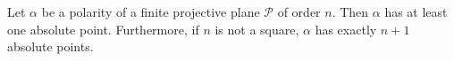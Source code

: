 Let $\alpha$ be a polarity of a finite projective plane $\mathcal{P}$ of order $n$. Then $\alpha$ has at least one absolute point. Furthermore, if $n$ is not a square, $\alpha$ has exactly $n+1$ absolute points.
